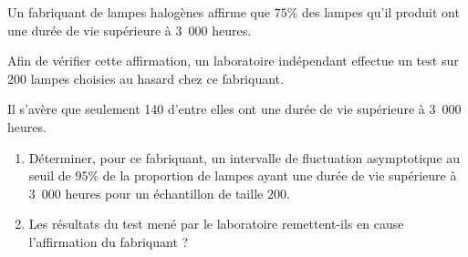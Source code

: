 \par
%
%
\par
Un fabriquant de lampes halogènes affirme que $75\%$ des lampes qu'il produit ont une durée de vie supérieure à 3\ 000 heures.
\par
Afin de vérifier cette affirmation, un laboratoire indépendant effectue un test sur 200 lampes choisies au hasard chez ce fabriquant.
\par
Il s'avère que seulement 140 d'entre elles ont une  durée de vie supérieure à 3\ 000 heures.
\par
\begin{enumerate}
     \item
     Déterminer, pour ce fabriquant, un intervalle de fluctuation asymptotique au seuil de $95\%$ de la proportion de lampes ayant une durée de vie supérieure à 3\ 000 heures pour un échantillon de taille 200.
     \item
     Les résultats du test mené par le laboratoire remettent-ils en cause l'affirmation du fabriquant ?
     \par
\end{enumerate}
